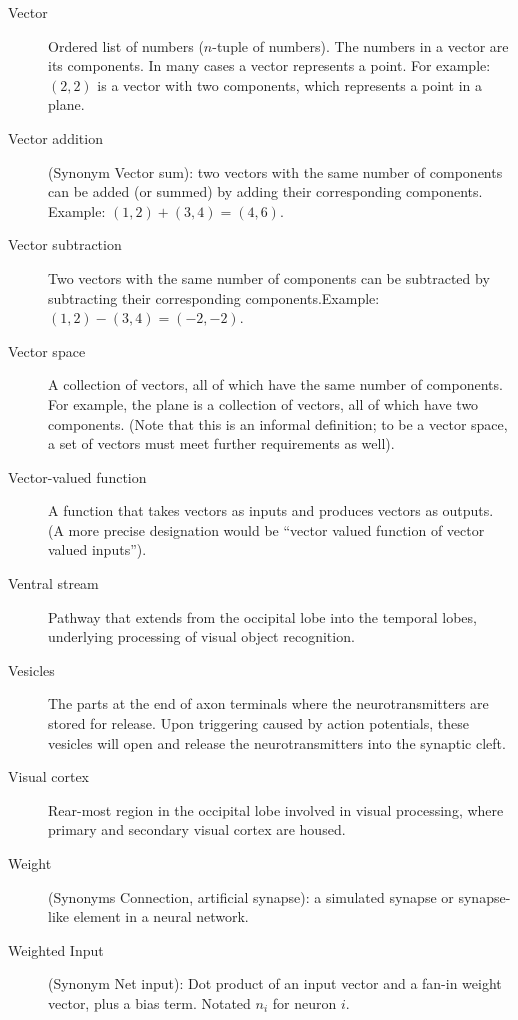 \begin{description}
\item[Vector] Ordered list of numbers ($n$-tuple of numbers). The numbers in a vector are its components. In many cases a vector represents a point. For example: $(2,2)$ is a vector with two components, which represents a point in a plane.

\item[Vector addition] (Synonym Vector sum): two vectors with the same number of components can be added (or summed) by adding their corresponding components. Example: $(1,2) + (3,4) = (4,6)$.

\item[Vector subtraction] Two vectors with the same number of components can be subtracted by subtracting their corresponding components.Example: $(1,2) - (3,4) = (-2,-2)$.

\item[Vector space] A collection of vectors, all of which have the same number of components. For example, the plane is a collection of vectors, all of which have two components. (Note that this is an  informal definition; to be a vector space, a set of vectors must meet further requirements as well).

\item[Vector-valued function] A function that takes vectors as inputs and produces vectors as outputs. (A more precise designation would be ``vector valued function of vector valued inputs''). 

\item[Ventral stream] Pathway that extends from the occipital lobe into the temporal lobes, underlying processing of visual object recognition. 

\item[Vesicles] The parts at the end of axon terminals where the neurotransmitters are stored for release. Upon triggering caused by action potentials, these vesicles will open and release the neurotransmitters into the synaptic cleft.

\item[Visual cortex] Rear-most region in the occipital lobe involved in visual processing, where primary and secondary visual cortex are housed.

\item[Weight] (Synonyms Connection, artificial synapse): a simulated synapse or synapse-like element in a neural network. 

\item[Weighted Input] (Synonym Net input): Dot product of an input vector and a fan-in weight vector, plus a bias term. Notated $n_i$ for neuron $i$.


\end{description}
